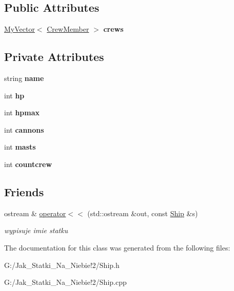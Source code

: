 \subsection*{Public Attributes}
\begin{DoxyCompactItemize}
\item 
\mbox{\label{class_ship_a24150015bbbbf80f26f8384e93781600}} 
\hyperlink{class_my_vector}{My\+Vector}$<$ \hyperlink{class_crew_member}{Crew\+Member} $>$ {\bfseries crews}
\end{DoxyCompactItemize}
\subsection*{Private Attributes}
\begin{DoxyCompactItemize}
\item 
\mbox{\label{class_ship_ae01c2006b542b0d65f8012d1dba2d1c3}} 
string {\bfseries name}
\item 
\mbox{\label{class_ship_aa2d86cea2f0912918e0ab9d23cecb0b1}} 
int {\bfseries hp}
\item 
\mbox{\label{class_ship_a4ccfeb413e8177d3aed3dee53e66bc4e}} 
int {\bfseries hpmax}
\item 
\mbox{\label{class_ship_ab066c9ad7347d6b8e35a73b086288710}} 
int {\bfseries cannons}
\item 
\mbox{\label{class_ship_aaf6c37ba28c1009a3bbabf20d2b29db0}} 
int {\bfseries masts}
\item 
\mbox{\label{class_ship_a625f12227e2dc73098c50c6e85d36e43}} 
int {\bfseries countcrew}
\end{DoxyCompactItemize}
\subsection*{Friends}
\begin{DoxyCompactItemize}
\item 
\mbox{\label{class_ship_a9c719ebfe58cebdabd53ebc0f6c16627}} 
ostream \& \hyperlink{class_ship_a9c719ebfe58cebdabd53ebc0f6c16627}{operator$<$$<$} (std\+::ostream \&out, const \hyperlink{class_ship}{Ship} \&s)
\begin{DoxyCompactList}\small\item\em wypisuje imie statku \end{DoxyCompactList}\end{DoxyCompactItemize}


The documentation for this class was generated from the following files\+:\begin{DoxyCompactItemize}
\item 
G\+:/\+Jak\+\_\+\+Statki\+\_\+\+Na\+\_\+\+Niebie!2/Ship.\+h\item 
G\+:/\+Jak\+\_\+\+Statki\+\_\+\+Na\+\_\+\+Niebie!2/Ship.\+cpp\end{DoxyCompactItemize}
